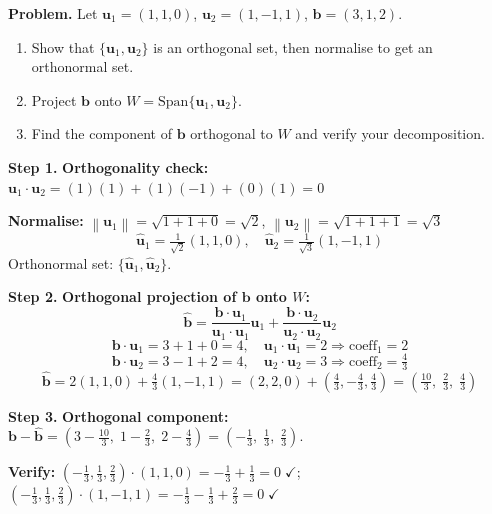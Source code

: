 \documentclass[12pt,a4paper]{article}
\newcommand{\step}[1]{\noindent\textbf{Step #1.}\;}
\newcommand{\norm}[1]{\left\lVert #1 \right\rVert}
\begin{document}
	\begin{tcolorbox}[worked]
		\textbf{Problem.} Let $\mathbf{u}_1=(1,1,0)$, $\mathbf{u}_2=(1,-1,1)$, $\mathbf{b}=(3,1,2)$.
		
		\begin{enumerate}[label=(\alph*), nosep]
			\item Show that $\{\mathbf{u}_1,\mathbf{u}_2\}$ is an orthogonal set, then normalise to get an orthonormal set.
			\item Project $\mathbf{b}$ onto $W = \text{Span}\{\mathbf{u}_1,\mathbf{u}_2\}$.
			\item Find the component of $\mathbf{b}$ orthogonal to $W$ and verify your decomposition.
		\end{enumerate}
		
		\step{1} \textbf{Orthogonality check:}
		$\mathbf{u}_1\cdot\mathbf{u}_2 = (1)(1)+(1)(-1)+(0)(1)=0$ \checkmark
		
		\textbf{Normalise:}
		$\norm{\mathbf{u}_1}=\sqrt{1+1+0}=\sqrt{2}$,\;
		$\norm{\mathbf{u}_2}=\sqrt{1+1+1}=\sqrt{3}$
		\[
		\hat{\mathbf{u}}_1=\tfrac{1}{\sqrt{2}}(1,1,0),\quad
		\hat{\mathbf{u}}_2=\tfrac{1}{\sqrt{3}}(1,-1,1)
		\]
		Orthonormal set: $\{\hat{\mathbf{u}}_1,\hat{\mathbf{u}}_2\}$.
		
		\step{2} \textbf{Orthogonal projection of $\mathbf{b}$ onto $W$:}
		\[
		\hat{\mathbf{b}} = \frac{\mathbf{b}\cdot\mathbf{u}_1}{\mathbf{u}_1\cdot\mathbf{u}_1}\mathbf{u}_1
		+ \frac{\mathbf{b}\cdot\mathbf{u}_2}{\mathbf{u}_2\cdot\mathbf{u}_2}\mathbf{u}_2
		\]
		\[
		\mathbf{b}\cdot\mathbf{u}_1=3+1+0=4,\quad \mathbf{u}_1\cdot\mathbf{u}_1=2
		\Rightarrow \text{coeff}_1=2
		\]
		\[
		\mathbf{b}\cdot\mathbf{u}_2=3-1+2=4,\quad \mathbf{u}_2\cdot\mathbf{u}_2=3
		\Rightarrow \text{coeff}_2=\tfrac{4}{3}
		\]
		\[
		\hat{\mathbf{b}} = 2(1,1,0)+\tfrac{4}{3}(1,-1,1)
		= (2,2,0)+(\tfrac{4}{3},-\tfrac{4}{3},\tfrac{4}{3})
		= \left(\tfrac{10}{3},\;\tfrac{2}{3},\;\tfrac{4}{3}\right)
		\]
		
		\step{3} \textbf{Orthogonal component:}
		$\mathbf{b}-\hat{\mathbf{b}}=(3-\tfrac{10}{3},\;1-\tfrac{2}{3},\;2-\tfrac{4}{3})=(-\tfrac{1}{3},\;\tfrac{1}{3},\;\tfrac{2}{3})$.
		
		\textbf{Verify:} $(-\tfrac{1}{3},\tfrac{1}{3},\tfrac{2}{3})\cdot(1,1,0)=-\tfrac{1}{3}+\tfrac{1}{3}=0\;\checkmark$;\quad
		$(-\tfrac{1}{3},\tfrac{1}{3},\tfrac{2}{3})\cdot(1,-1,1)=-\tfrac{1}{3}-\tfrac{1}{3}+\tfrac{2}{3}=0\;\checkmark$
	\end{tcolorbox}
	
\end{document}
